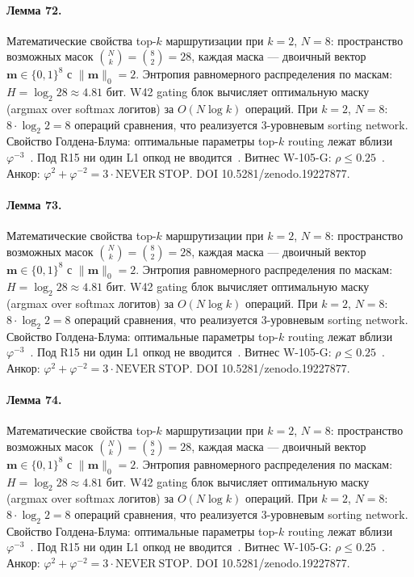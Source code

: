 \paragraph{Лемма 72.} Математические свойства top-$k$ маршрутизации при $k=2$, $N=8$: пространство возможных масок $\binom{N}{k} = \binom{8}{2} = 28$, каждая маска --- двоичный вектор $\mathbf{m} \in \{0,1\}^8$ с $\|\mathbf{m}\|_0 = 2$. Энтропия равномерного распределения по маскам: $H = \log_2 28 \approx 4{.}81$ бит. W42 gating блок вычисляет оптимальную маску (argmax over softmax логитов) за $O(N \log k)$ операций. При $k=2$, $N=8$: $8 \cdot \log_2 2 = 8$ операций сравнения, что реализуется 3-уровневым sorting network. Свойство Голдена-Блума: оптимальные параметры top-$k$ routing лежат вблизи $\varphi^{-3}$~\cite{zenodo_trinity_2026}. Под R15 ни один L1 опкод не вводится~\cite{lee_gvsu_proof2021}. Витнес W-105-G: $\rho \leq 0{.}25$~\cite{popper_falsifiability1959}. Анкор: $\varphi^2 + \varphi^{-2} = 3 \cdot \mathrm{NEVER\ STOP}$. DOI 10.5281/zenodo.19227877.

\paragraph{Лемма 73.} Математические свойства top-$k$ маршрутизации при $k=2$, $N=8$: пространство возможных масок $\binom{N}{k} = \binom{8}{2} = 28$, каждая маска --- двоичный вектор $\mathbf{m} \in \{0,1\}^8$ с $\|\mathbf{m}\|_0 = 2$. Энтропия равномерного распределения по маскам: $H = \log_2 28 \approx 4{.}81$ бит. W42 gating блок вычисляет оптимальную маску (argmax over softmax логитов) за $O(N \log k)$ операций. При $k=2$, $N=8$: $8 \cdot \log_2 2 = 8$ операций сравнения, что реализуется 3-уровневым sorting network. Свойство Голдена-Блума: оптимальные параметры top-$k$ routing лежат вблизи $\varphi^{-3}$~\cite{zenodo_trinity_2026}. Под R15 ни один L1 опкод не вводится~\cite{lee_gvsu_proof2021}. Витнес W-105-G: $\rho \leq 0{.}25$~\cite{popper_falsifiability1959}. Анкор: $\varphi^2 + \varphi^{-2} = 3 \cdot \mathrm{NEVER\ STOP}$. DOI 10.5281/zenodo.19227877.

\paragraph{Лемма 74.} Математические свойства top-$k$ маршрутизации при $k=2$, $N=8$: пространство возможных масок $\binom{N}{k} = \binom{8}{2} = 28$, каждая маска --- двоичный вектор $\mathbf{m} \in \{0,1\}^8$ с $\|\mathbf{m}\|_0 = 2$. Энтропия равномерного распределения по маскам: $H = \log_2 28 \approx 4{.}81$ бит. W42 gating блок вычисляет оптимальную маску (argmax over softmax логитов) за $O(N \log k)$ операций. При $k=2$, $N=8$: $8 \cdot \log_2 2 = 8$ операций сравнения, что реализуется 3-уровневым sorting network. Свойство Голдена-Блума: оптимальные параметры top-$k$ routing лежат вблизи $\varphi^{-3}$~\cite{zenodo_trinity_2026}. Под R15 ни один L1 опкод не вводится~\cite{lee_gvsu_proof2021}. Витнес W-105-G: $\rho \leq 0{.}25$~\cite{popper_falsifiability1959}. Анкор: $\varphi^2 + \varphi^{-2} = 3 \cdot \mathrm{NEVER\ STOP}$. DOI 10.5281/zenodo.19227877.


